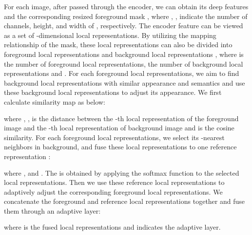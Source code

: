 \documentclass[sigconf]{acmart}
\begin{document}
For each image, after passed through the encoder, we can obtain its deep features  and the corresponding resized foreground mask , where , ,  indicate the number of channels, height, and width of , respectively. The encoder feature  can be viewed as a set of  -dimensional local representations. By utilizing the mapping relationship of the mask, these local representations can also be divided into foreground local representations  and background local representations , where  is the number of foreground local representations,  the number of background local representations and . For each foreground local representations,  we aim to find background local representations with similar appearance and semantics and use these background local representations to adjust its appearance. We first calculate  similarity map  as below:

where , ,  is the distance
between the -th local representation of the foreground image and the -th local representation of background image and  is the cosine similarity. For each foreground local representations, we select its -nearest neighbors in background, and fuse these local representations to one reference representation :

where ,  and . The  is obtained by applying the softmax function to the selected  local representations. Then we use these reference local representations to adaptively adjust the corresponding foreground local representations. We concatenate the foreground and reference local representations together and fuse them through an adaptive layer:

where  is the fused local representations and  indicates the adaptive layer.
\end{document}
